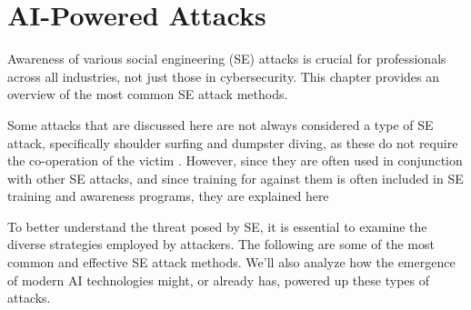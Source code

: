 


\chapter{AI-Powered Attacks\label{chapter:attacks}}
\begin{comment}

Guides:
    - About 3-4 pages

TODO:
    [ ] 

What to cover:
    - Attacks
        - Deepfake generated synthetic media
            - Videos
            - Images
            - Audio
            - Real-time voice morphing
    
Literature:
    - 

\end{comment}

Awareness of various social engineering (SE) attacks is crucial for professionals across all industries, not just those in cybersecurity. This chapter provides an overview of the most common SE attack methods. 


Some attacks that are discussed here are not always considered a type of SE attack, specifically shoulder surfing and dumpster diving, as these do not require the co-operation of the victim \citep{wangDefiningSocialEngineering2020}. However, since they are often used in conjunction with other SE attacks, and since training for against them is often included in SE training and awareness programs, they are explained here


To better understand the threat posed by SE, it is essential to examine the diverse strategies employed by attackers. The following are some of the most common and effective SE attack methods. We'll also analyze how the emergence of modern AI technologies might, or already has, powered up these types of attacks.

